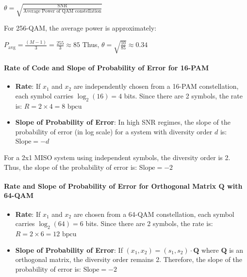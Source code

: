 \documentclass[11pt]{article}
\begin{document}
\(\theta = \sqrt{\frac{\text{SNR}}{\text{Average Power of QAM constellation}}}\)

For 256-QAM, the average power is approximately:

\(P_{\text{avg}} = \frac{(M-1)}{3} = \frac{255}{3} \approx 85\) Thus,
\(\theta = \sqrt{\frac{10}{85}} \approx 0.34\)

\paragraph{Rate of Code and Slope of Probability of Error for
16-PAM}\label{rate-of-code-and-slope-of-probability-of-error-for-16-pam}

\begin{itemize}
\item
  \textbf{Rate}: If \(x_1\) and \(x_2\) are independently chosen from a
  16-PAM constellation, each symbol carries \(\log_2(16) = 4\) bits.
  Since there are 2 symbols, the rate is:
  \(R = 2 \times 4 = 8 \text{ bpcu}\)
\item
  \textbf{Slope of Probability of Error}: In high SNR regimes, the slope
  of the probability of error (in log scale) for a system with diversity
  order \(d\) is: \(\text{Slope} = -d\)
\end{itemize}

For a 2x1 MISO system using independent symbols, the diversity order is
2. Thus, the slope of the probability of error is: \(\text{Slope} = -2\)

\paragraph{\texorpdfstring{Rate and Slope of Probability of Error for
Orthogonal Matrix \(\mathbf{Q}\) with
64-QAM}{Rate and Slope of Probability of Error for Orthogonal Matrix \textbackslash mathbf\{Q\} with 64-QAM}}\label{rate-and-slope-of-probability-of-error-for-orthogonal-matrix-mathbfq-with-64-qam}

\begin{itemize}
\item
  \textbf{Rate}: If \(x_1\) and \(x_2\) are chosen from a 64-QAM
  constellation, each symbol carries \(\log_2(64) = 6\) bits. Since
  there are 2 symbols, the rate is: \(R = 2 \times 6 = 12 \text{ bpcu}\)
\item
  \textbf{Slope of Probability of Error}: If
  \((x_1, x_2) = (s_1, s_2) \cdot \mathbf{Q}\) where \(\mathbf{Q}\) is
  an orthogonal matrix, the diversity order remains 2. Therefore, the
  slope of the probability of error is: \(\text{Slope} = -2\)
\end{itemize}
\end{document}
